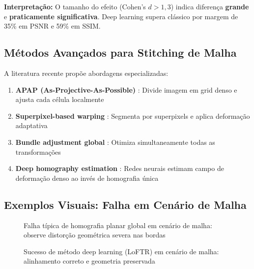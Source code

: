\textbf{Interpretação:} O tamanho do efeito (Cohen's $d > 1,3$) indica diferença \textbf{grande} e \textbf{praticamente significativa}. Deep learning supera clássico por margem de 35\% em PSNR e 59\% em SSIM.

\subsection{Métodos Avançados para Stitching de Malha}

A literatura recente propõe abordagens especializadas:

\begin{enumerate}
    \item \textbf{APAP (As-Projective-As-Possible)} \cite{Zaragoza2013}: Divide imagem em grid denso e ajusta cada célula localmente

    \item \textbf{Superpixel-based warping} \cite{Pan2024}: Segmenta por superpixels e aplica deformação adaptativa

    \item \textbf{Bundle adjustment global} \cite{Zhang2024}: Otimiza simultaneamente todas as transformações

    \item \textbf{Deep homography estimation} \cite{Le2020}: Redes neurais estimam campo de deformação denso ao invés de homografia única
\end{enumerate}

\subsection{Exemplos Visuais: Falha em Cenário de Malha}

\begin{figure}[htb]
\centering
\caption{Falha típica de homografia planar global em cenário de malha: observe distorção geométrica severa nas bordas}
\label{fig:malha_failure}
\end{figure}

\begin{figure}[htb]
\centering
\caption{Sucesso de método deep learning (LoFTR) em cenário de malha: alinhamento correto e geometria preservada}
\label{fig:malha_success}
\end{figure}

